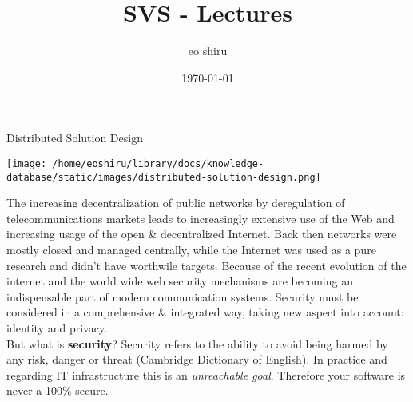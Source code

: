 \documentclass[11pt]{article}
\author{eo shiru}
\date{\today}
\title{SVS - Lectures}
\begin{document}
\maketitle
\tableofcontents

Distributed Solution Design\\
\begin{center}
\texttt{[image: /home/eoshiru/library/docs/knowledge-database/static/images/distributed-solution-design.png]}
\end{center}

The increasing decentralization of public networks by deregulation of telecommunications markets leads to increasingly extensive use of the Web and increasing usage of the open \& decentralized Internet. Back then networks were mostly closed and managed centrally, while the Internet was used as a pure research and didn't have worthwile targets. Because of the recent evolution of the internet and the world wide web security mechanisms are becoming an indispensable part of modern communication systems. Security must be considered in a comprehensive \& integrated way, taking new aspect into account: identity and privacy.\\
But what is \textbf{security}? Security refers to the ability to avoid being harmed by any risk, danger or threat (Cambridge Dictionary of English). In practice and regarding IT infrastructure this is an \emph{unreachable goal}. Therefore your software is never a 100\% secure.
\end{document}
